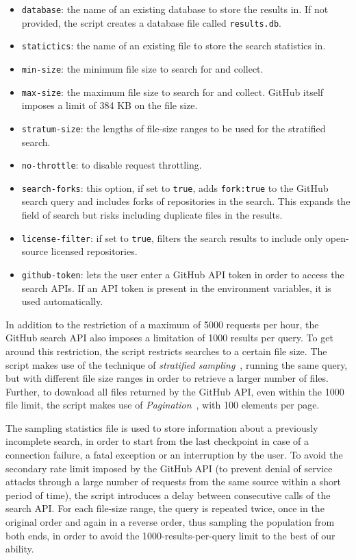 \documentclass[10pt,conference]{IEEEtran}
\begin{document}
\begin{itemize}
\begin{itemize}
			\item \texttt{database}: the name of an existing database to store the results in. If not provided, the script creates a database file called \texttt{results.db}.
			\item \texttt{statictics}: the name of an existing file to store the search statistics in.
			\item \texttt{min-size}: the minimum file size to search for and collect.
			\item \texttt{max-size}: the maximum file size to search for and collect. GitHub itself imposes a limit of 384 KB on the file size.
			\item \texttt{stratum-size}: the lengths of file-size ranges to be used for the stratified search.
			\item \texttt{no-throttle}: to disable request throttling.
			\item \texttt{search-forks}: this option, if set to \texttt{true}, adds \texttt{fork:true} to the GitHub search query and includes forks of repositories in the search. This expands the field of search but risks including duplicate files in the results.
			\item \texttt{license-filter}: if set to \texttt{true}, filters the search results to include only open-source licensed repositories.
			\item \texttt{github-token}: lets the user enter a GitHub API token in order to access the search APIs. If an API token is present in the environment variables, it is used automatically.
		\end{itemize}
		
		In addition to the restriction of a maximum of 5000 requests per hour, the GitHub search API also imposes a limitation of 1000 results per query. To get around this restriction, the script restricts searches to a certain file size. The script makes use of the technique of \textit{stratified sampling}~\cite{stratifiedsampling}, running the same query, but with different file size ranges in order to retrieve a larger number of files. Further, to download all files returned by the GitHub API, even within the 1000 file limit, the script makes use of \textit{Pagination}~\cite{pagination}, with 100 elements per page.
		
		The sampling statistics file is used to store information about a previously incomplete search, in order to start from the last checkpoint in case of a connection failure, a fatal exception or an interruption by the user. To avoid the secondary rate limit imposed by the GitHub API (to prevent denial of service attacks through a large number of requests from the same source within a short period of time), the script introduces a delay between consecutive calls of the search API. For each file-size range, the query is repeated twice, once in the original order and again in a reverse order, thus sampling the population from both ends, in order to avoid the 1000-results-per-query limit to the best of our ability.
		

\end{itemize}
\end{document}
